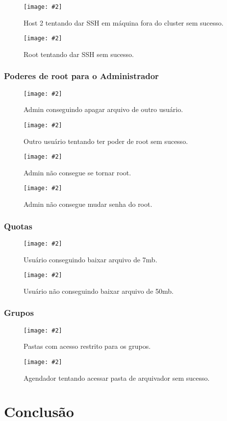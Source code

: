 \documentclass[
	12pt,				%
	openany,			%
	a4paper,			%
	chapter=TITLE,		%
	section=TITLE,		%
	english,
	brazil				%
]{abntex2}
\newcommand{\includeImage}[3] {

\begin{figure}[H]
 	 \centering
  		\texttt{[image: \#2]}
  	\caption{#3}
\end{figure}

}
\begin{document}
\includeImage{0.7}{imgs/testes/3-host2_nao_consegue_dar_ssh_em_maquina_fora_do_cluster.png}{Host 2 tentando dar SSH em máquina fora do cluster sem sucesso.}

\includeImage{0.6}{imgs/testes/5-root_tentando_dar_ssh_sem_sucesso.png}{Root tentando dar SSH sem sucesso.}

\subsection{Poderes de root para o Administrador}

\includeImage{0.6}{imgs/testes/6-admin_deletando_arquivo_do_agendador_com_sucesso.png}{Admin conseguindo apagar arquivo de outro usuário.}

\includeImage{0.6}{imgs/testes/6-arquivador_tentando_apagar_o_arquivo_do_agendador_sem_sucesso.png}{Outro usuário tentando ter poder de root sem sucesso.}

\includeImage{0.55}{imgs/testes/6-admin_nao_consegue_se_tornar_root.png}{Admin não consegue se tornar root.}

\includeImage{0.55}{imgs/testes/6-admin_nao_consegue_mudar_senha_do_root.png}{Admin não consegue mudar senha do root.}

\subsection{Quotas}

\includeImage{0.55}{imgs/testes/6-agendador_baixando_arquivo_de_7mb_com_sucesso.png}{Usuário conseguindo baixar arquivo de 7mb.}

\includeImage{0.55}{imgs/testes/6-agendador_baixando_arquivo_de_50_sem_sucesso.png}{Usuário não conseguindo baixar arquivo de 50mb.}

\subsection{Grupos}

\includeImage{0.6}{imgs/testes/7-pastas_para_os_grupos_com_acesso_restrito.png}{Pastas com acesso restrito para os grupos.}

\includeImage{0.6}{imgs/testes/7-agendador_nao_conseguindo_escrever_na_pasta_de_arquivadores.png}{Agendador tentando acessar pasta de arquivador sem sucesso.}





\chapter{Conclusão}
\end{document}
